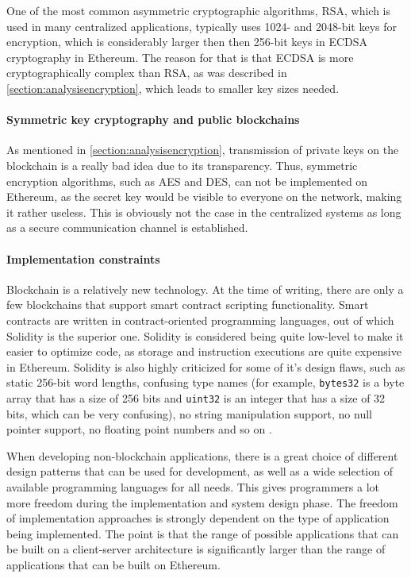 One of the most common asymmetric cryptographic algorithms, RSA, which is used in many centralized applications, typically uses 1024- and 2048-bit keys for encryption, which is considerably larger then then 256-bit keys in ECDSA cryptography in Ethereum. The reason for that is that ECDSA is more cryptographically complex than RSA, as was described in \ref{section:analysisencryption}, which leads to smaller key sizes needed.

\paragraph{Symmetric key cryptography and public blockchains}
As mentioned in \ref{section:analysisencryption}, transmission of private keys on the blockchain is a really bad idea due to its transparency. Thus, symmetric encryption algorithms, such as AES and DES, can not be implemented on Ethereum, as the secret key would be visible to everyone on the network, making it rather useless. This is obviously not the case in the centralized systems as long as a secure communication channel is established.

\paragraph{Implementation constraints}
Blockchain is a relatively new technology. At the time of writing, there are only a few blockchains that support smart contract scripting functionality. Smart contracts are written in contract-oriented programming languages, out of which Solidity is the superior one. Solidity is considered being quite low-level to make it easier to optimize code, as storage and instruction executions are quite expensive in Ethereum. Solidity is also highly criticized for some of it's design flaws, such as static 256-bit word lengths, confusing type names (for example, \texttt{bytes32} is a byte array that has a size of 256 bits and \texttt{uint32} is an integer that has a size of 32 bits, which can be very confusing), no string manipulation support, no null pointer support, no floating point numbers and so on \citep{soliditybad}. 

When developing non-blockchain applications, there is a great choice of different design patterns that can be used for development, as well as a wide selection of available programming languages for all needs. This gives programmers a lot more freedom during the implementation and system design phase. The freedom of implementation approaches is strongly dependent on the type of application being implemented. The point is that the range of possible applications that can be built on a client-server architecture is significantly larger than the range of applications that can be built on Ethereum.


